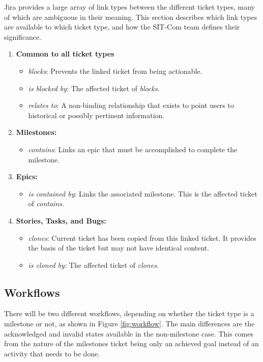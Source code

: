 \documentclass[SE,authoryear,toc]{lsstdoc}
\begin{document}
Jira provides a large array of link types between the different ticket types, many of which are ambiguous in their meaning. 
This section describes which link types are available to which ticket type, and how the SIT-Com team defines their significance.

\begin{enumerate}
  \item \textbf{Common to all ticket types}
  \begin{itemize}
    \item \emph{blocks}: Prevents the linked ticket from being actionable.
    \item \emph{is blocked by}: The affected ticket of \emph{blocks}.
    \item \emph{relates to}: A non-binding relationship that exists to point users to historical or possibly pertinent information.
  \end{itemize}

  \item \textbf{Milestones:}
  \begin{itemize}
    \item \emph{contains}: Links an epic that must be accomplished to complete the milestone.
  \end{itemize}

  \item \textbf{Epics:}
  \begin{itemize}
    \item \emph{is contained by}: Links the associated milestone. 
    This is the affected ticket of \emph{contains}.
  \end{itemize}

  \item \textbf{Stories, Tasks, and Bugs:}
  \begin{itemize}
    \item \emph{clones}: Current ticket has been copied from this linked ticket. 
    It provides the basis of the ticket but may not have identical content.
    \item \emph{is cloned by:} The affected ticket of \emph{clones}.
  \end{itemize}
\end{enumerate}



\subsection{Workflows}
There will be two different workflows, depending on whether the ticket type is a milestone or not, as shown in Figure \ref{fig:workflow}. 
The main differences are the acknowledged and invalid states available in the non-milestone case.  
This comes from the nature of the milestones ticket being only an achieved goal instead of an activity that needs to be done. 
\end{document}
